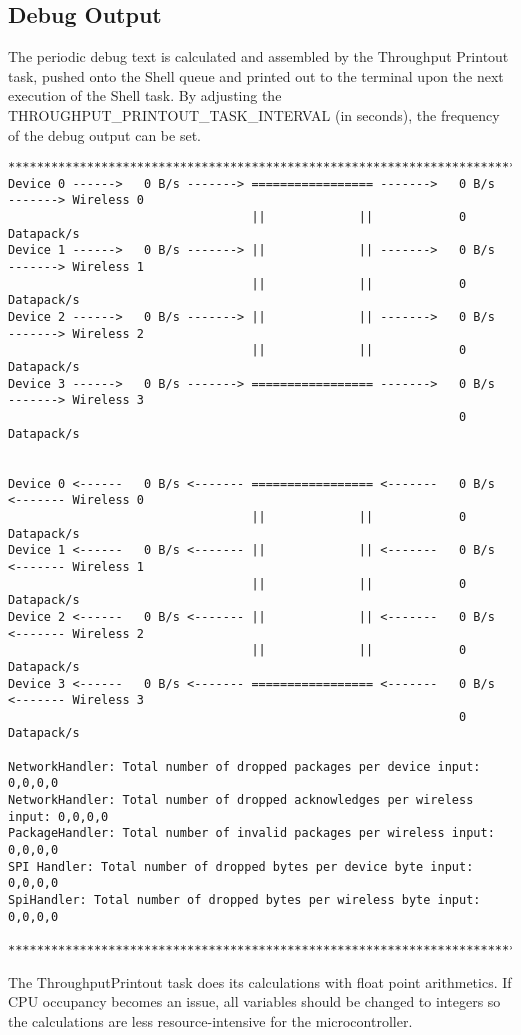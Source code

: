 \subsection{Debug Output}
The periodic debug text is calculated and assembled by the Throughput Printout task, pushed onto the Shell queue and printed out to the terminal upon the next execution of the Shell task. By adjusting the THROUGHPUT\_PRINTOUT\_TASK\_INTERVAL (in seconds), the frequency of the debug output can be set. \newpage
\begin{lstlisting}
*******************************************************************************************
Device 0 ------>   0 B/s -------> ================= ------->   0 B/s   -------> Wireless 0
                                  ||             ||            0 Datapack/s
Device 1 ------>   0 B/s -------> ||             || ------->   0 B/s   -------> Wireless 1
                                  ||             ||            0 Datapack/s
Device 2 ------>   0 B/s -------> ||             || ------->   0 B/s   -------> Wireless 2
                                  ||             ||            0 Datapack/s
Device 3 ------>   0 B/s -------> ================= ------->   0 B/s   -------> Wireless 3
                                                               0 Datapack/s


Device 0 <------   0 B/s <------- ================= <-------   0 B/s   <------- Wireless 0
                                  ||             ||            0 Datapack/s
Device 1 <------   0 B/s <------- ||             || <-------   0 B/s   <------- Wireless 1
                                  ||             ||            0 Datapack/s
Device 2 <------   0 B/s <------- ||             || <-------   0 B/s   <------- Wireless 2
                                  ||             ||            0 Datapack/s
Device 3 <------   0 B/s <------- ================= <-------   0 B/s   <------- Wireless 3
                                                               0 Datapack/s
                                                               
NetworkHandler: Total number of dropped packages per device input: 0,0,0,0
NetworkHandler: Total number of dropped acknowledges per wireless input: 0,0,0,0
PackageHandler: Total number of invalid packages per wireless input: 0,0,0,0
SPI Handler: Total number of dropped bytes per device byte input: 0,0,0,0
SpiHandler: Total number of dropped bytes per wireless byte input: 0,0,0,0

*******************************************************************************************
\end{lstlisting}
The ThroughputPrintout task does its calculations with float point arithmetics. If CPU occupancy becomes an issue, all variables should be changed to integers so the calculations are less resource-intensive for the microcontroller.
%
%
